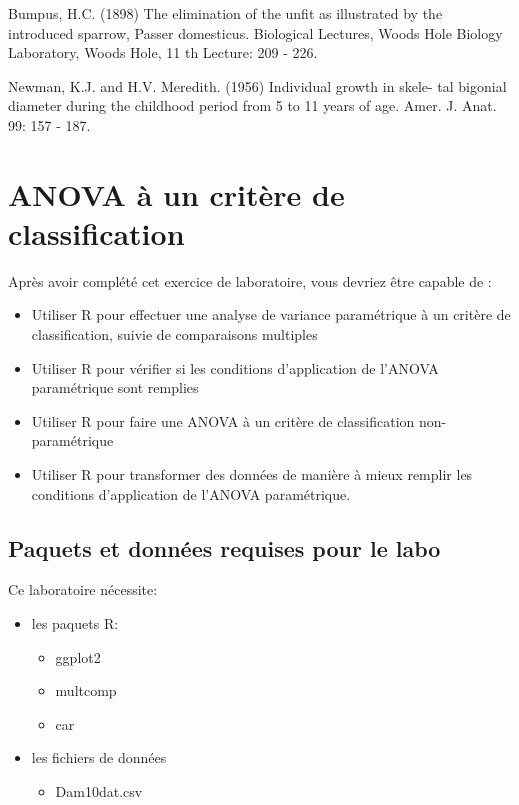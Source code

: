 \documentclass[
  12pt,
]{book}
\providecommand{\tightlist}{%
  \setlength{\itemsep}{0pt}\setlength{\parskip}{0pt}}
\begin{document}
Bumpus, H.C. (1898) The elimination of the unfit as illustrated by the introduced sparrow, Passer domesticus. Biological Lectures, Woods Hole Biology Laboratory, Woods Hole, 11 th Lecture: 209 - 226.

Newman, K.J. and H.V. Meredith. (1956) Individual growth in skele- tal bigonial diameter during the childhood period from 5 to 11 years of age. Amer. J. Anat. 99: 157 - 187.

\hypertarget{anova-uxe0-un-crituxe8re-de-classification}{%
\chapter{ANOVA à un critère de classification}\label{anova-uxe0-un-crituxe8re-de-classification}}

Après avoir complété cet exercice de laboratoire, vous devriez être capable de :

\begin{itemize}
\tightlist
\item
  Utiliser R pour effectuer une analyse de variance paramétrique à un critère de classification, suivie de comparaisons multiples
\item
  Utiliser R pour vérifier si les conditions d'application de l'ANOVA paramétrique sont remplies
\item
  Utiliser R pour faire une ANOVA à un critère de classification non-paramétrique
\item
  Utiliser R pour transformer des données de manière à mieux remplir les conditions d'application de l'ANOVA paramétrique.
\end{itemize}

\hypertarget{set-ano}{%
\section{Paquets et données requises pour le labo}\label{set-ano}}

Ce laboratoire nécessite:

\begin{itemize}
\tightlist
\item
  les paquets R:

  \begin{itemize}
  \tightlist
  \item
    ggplot2
  \item
    multcomp
  \item
    car
  \end{itemize}
\item
  les fichiers de données

  \begin{itemize}
  \tightlist
  \item
    Dam10dat.csv
  \end{itemize}
\end{itemize}
\end{document}
